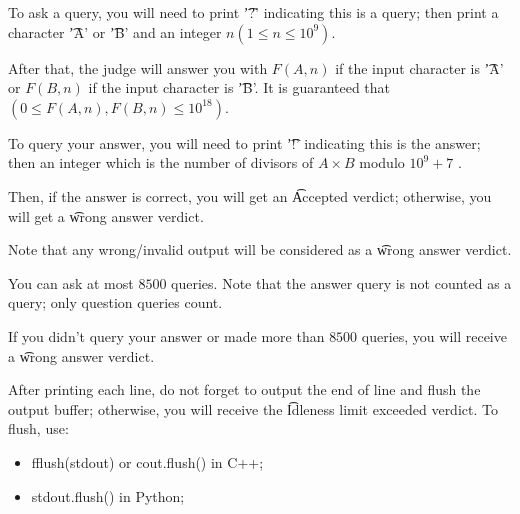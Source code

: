 To ask a query, you will need to print \t{'?'} indicating this is a query; then print a character \t{'A'} or \t{'B'} and an integer $n (1 \leq n \leq 10^{9})$.

After that, the judge will answer you with $F(A, n)$ if the input character is \t{'A'} or $F(B, n)$ if the input character is \t{'B'}. It is guaranteed that $(0 \leq F(A, n), F(B, n) \leq 10^{18})$.

To query your answer, you will need to print \t{'!'} indicating this is the answer; then an integer which is the number of divisors of $A \times B$ modulo $10^9 + 7$ .

Then, if the answer is correct, you will get an \t{Accepted} verdict; otherwise, you will get a \t{wrong answer} verdict.

Note that any wrong/invalid output will be considered as a \t{wrong answer} verdict.

You can ask at most $8500$ queries. Note that the answer query is not counted as a query; only question queries count.

If you didn't query your answer or made more than $8500$ queries, you will receive a \t{wrong answer} verdict. 

After printing each line, do not forget to output the end of line and flush the output buffer; otherwise, you will receive the \t{Idleness limit exceeded} verdict. To flush, use:

\begin{itemize}
  \item \t{ fflush(stdout) } or \t{ cout.flush() } in C++;
  \item stdout.flush() in Python;
\end{itemize}